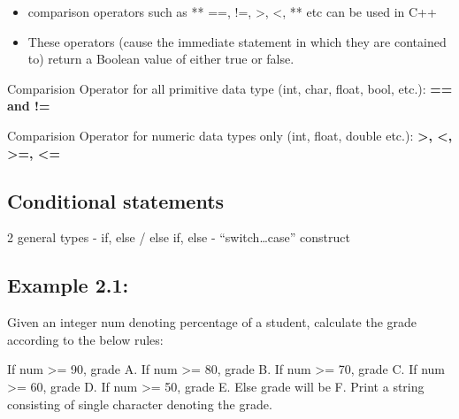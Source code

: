 \documentclass[
]{article}
\begin{document}
\begin{itemize}
\item
  comparison operators such as ** ==, !=, \textgreater, \textless, **
  etc can be used in C++
\item
  These operators (cause the immediate statement in which they are
  contained to) return a Boolean value of either true or false.
\end{itemize}

Comparision Operator for all primitive data type (int, char, float,
bool, etc.): \textbf{== and != }

Comparision Operator for numeric data types only (int, float, double
etc.): \textbf{\textgreater, \textless, \textgreater=, \textless= }

\subsection{Conditional statements}\label{conditional-statements}

2 general types - if, else / else if, else - ``switch\ldots case''
construct

\subsection{Example 2.1:}\label{example-2.1}

Given an integer num denoting percentage of a student, calculate the
grade according to the below rules:

If num \textgreater= 90, grade A. If num \textgreater= 80, grade B. If
num \textgreater= 70, grade C. If num \textgreater= 60, grade D. If num
\textgreater= 50, grade E. Else grade will be F. Print a string
consisting of single character denoting the grade.
\end{document}

